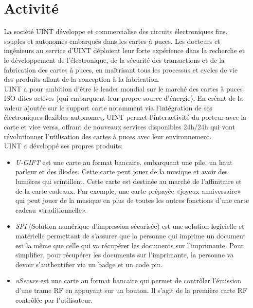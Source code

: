 
\section{Activité}

La société UINT développe et commercialise des circuits	électroniques fins, souples et autonomes embarqués dans	les cartes à puces. Les docteurs et ingénieurs au service d’UINT déploient leur forte expérience dans la recherche et le développement de l’électronique, de la sécurité des transactions et de la fabrication des cartes à puces, en maîtrisant tous les processus et cycles de vie des produits allant de la conception à la fabrication.\\

UINT a pour ambition d’être le leader mondial sur le marché des cartes à puces ISO dites actives (qui embarquent leur propre source d’énergie). En créant de la valeur ajoutée sur le support carte notamment via l’intégration de ses électroniques flexibles autonomes, UINT permet l’interactivité du porteur avec la carte et vice versa, offrant de nouveaux services disponibles 24h/24h qui vont révolutionner l’utilisation des cartes à puces avec leur environnement.\\

UINT a développé ses propres produits:\\

\begin{itemize}
\item \textit{U-GIFT} est une carte au format bancaire, embarquant une pile, un haut parleur et des diodes. Cette carte peut jouer de la musique et avoir des lumières qui scintillent. Cette carte est destinée au marché de l’affinitaire et de la carte cadeaux. Par exemple, une carte prépayée «joyeux anniversaire» qui peut jouer de la musique en plus de toutes les autres fonctions d’une carte cadeau «traditionnelle».
\item \textit{SPI} (Solution numérique d’impression sécurisée) est une solution logicielle et matérielle permettant de s’assurer que la personne qui imprime un document est la même que celle qui va récupérer les documents sur l’imprimante. Pour simplifier, pour récupérer les documents sur l’imprimante, la personne va devoir s’authentifier via un badge et un code pin.
\item \textit{uSecure} est une carte au format bancaire qui permet de contrôler l’émission d’une trame RF en appuyant sur un bouton. Il s’agit de la première carte RF contrôlée par l’utilisateur.
\end{itemize}


